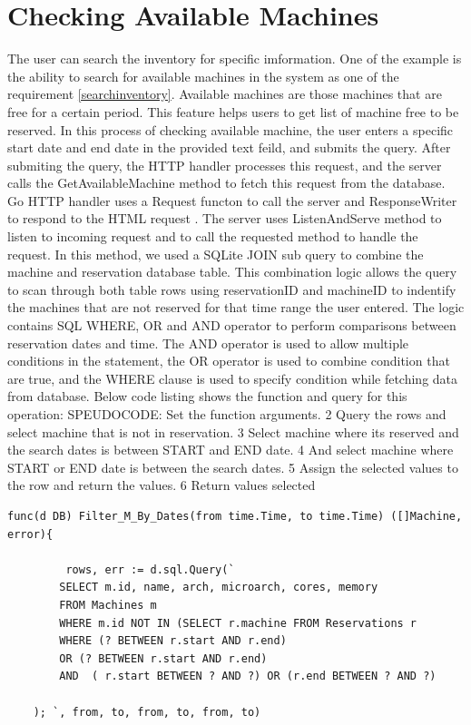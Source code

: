 \section*{Checking Available Machines}
The user can search the inventory for specific imformation. One of the example is the ability to search for available machines in the system as one of the requirement \ref{searchinventory}. Available machines are those machines that are free for a certain period. This feature helps users to get list of machine free to be reserved. In this process of checking available machine, the user enters a specific start date and end date in the provided text feild, and submits the query. After submiting the query, the HTTP handler processes this request, and the server calls the GetAvailableMachine method to fetch this request from the database. Go HTTP handler uses a Request functon to call the server and  ResponseWriter to respond to the HTML request \cite{Gohttp}. The server uses ListenAndServe method to listen to incoming request and to call the requested method to handle the request. In this method, we used a SQLite JOIN sub query to combine the machine and reservation database table. This combination logic allows the query to scan through both table rows using reservationID and machineID to indentify the machines that are not reserved for that time range the user entered. The logic contains SQL WHERE, OR and AND operator to perform comparisons between reservation dates and time. \cite{ANDOR}The AND operator is used to allow multiple conditions in the statement,  the OR operator is used to combine condition that are true, and the WHERE clause is used to specify condition while fetching data from database\cite{WHEREclause}. 
Below code listing shows the function and query for this operation:
SPEUDOCODE: Set the function arguments.
2 Query the rows and select machine that is not in reservation.
3 Select machine where its reserved and the search dates is between  START and END date. 
4 And  select machine where START or END date is between the search dates.
5 Assign the selected values to the row and return the values.
6 Return values selected 

\begin{lstlisting}[caption=Searching available, label=Search available machine]
func(d DB) Filter_M_By_Dates(from time.Time, to time.Time) ([]Machine, error){

         rows, err := d.sql.Query(`
		SELECT m.id, name, arch, microarch, cores, memory
		FROM Machines m
		WHERE m.id NOT IN (SELECT r.machine FROM Reservations r
		WHERE (? BETWEEN r.start AND r.end)
		OR (? BETWEEN r.start AND r.end)
		AND  ( r.start BETWEEN ? AND ?) OR (r.end BETWEEN ? AND ?)
	
	); `, from, to, from, to, from, to)
\end{lstlisting}
